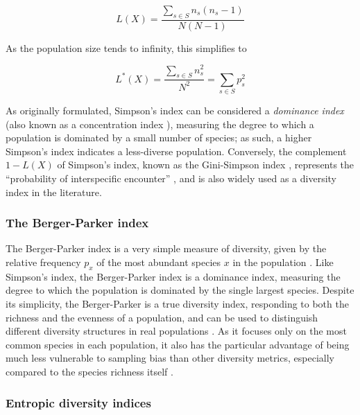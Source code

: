 \begin{equation}
L(X) = \frac{\sum_{s \in S} n_s(n_s-1)}{N(N-1)}
\label{eq:simpson_finite}
\end{equation} 

\noindent As the population size tends to infinity, this simplifies to

\begin{equation}
L^*(X) = \frac{\sum_{s \in S} n_s^2}{N^2} = \sum_{s \in S} p_s^2
\label{eq:simpson_finite}
\end{equation} 

\noindent As originally formulated, Simpson's index can be considered a \textit{dominance index} (also known as a concentration  index \citep{simpson1949diversity}), measuring the degree to which a population is dominated by a small number of species; as such, a higher Simpson's index indicates a less-diverse population. Conversely, the complement $1-L(X)$ of Simpson's index, known as the Gini-Simpson index \citep{jost2006entropy}, represents the ``probability of interspecific encounter'' \citep{peet1974diversity}, and is also widely used as a diversity index in the literature.

\subsubsection{The Berger-Parker index}
\label{app:diversity-unitary-simple-berger}

The Berger-Parker index is a very simple measure of diversity, given by the relative frequency $p_x$ of the most abundant species $x$ in the population \parencite{berger1970diversity,caruso2008bergerparker}. Like Simpson's index, the Berger-Parker index is a dominance index, measuring the degree to which the population is dominated by the single largest species. Despite its simplicity, the Berger-Parker is a true diversity index, responding to both the richness and the evenness of a population, and can be used to distinguish different diversity structures in real populations \parencite{caruso2008bergerparker}. As it focuses only on the most common species in each population, it also has the particular advantage of being much less vulnerable to sampling bias than other diversity metrics, especially compared to the species richness itself \parencite{berger1970diversity}.

\subsubsection{Entropic diversity indices}
\label{app:diversity-unitary-simple-entropy}

